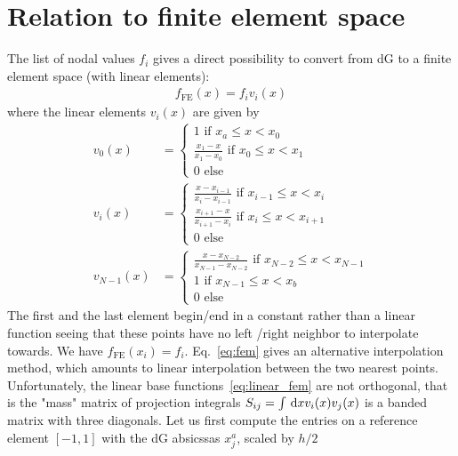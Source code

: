 \section{Relation to finite element space}
The list of nodal values $f_i$ gives a direct possibility to convert from dG to a finite element space (with linear elements):
\begin{align} \label{eq:fem}
    f_{\text{FE}}(x) = f_{i} v_{i}(x)
\end{align}
where the linear elements $v_i(x)$ are given by
\begin{align}\label{eq:linear_fem}
    v_0(x) &= \begin{cases}
        1 \text{ if } x_{a}\leq x<x_{0} \\
        \frac{x_{1} - x}{x_{1} - x_{0}} \text{ if } x_{0}\leq x<x_{1} \\
         0 \text{ else}
    \end{cases}
    \\
    v_{i}(x) &= \begin{cases}
        \frac{x - x_{i-1} }{x_{i} - x_{i-1}} \text{ if } x_{i-1}\leq x<x_{i} \\
        \frac{x_{i+1} - x}{x_{i+1} - x_{i}} \text{ if } x_{i}\leq x<x_{i+1} \\
         0 \text{ else}
    \end{cases}
    \\
    v_{N-1}(x) &= \begin{cases}
        \frac{x - x_{N-2} }{x_{N-1} - x_{N-2}} \text{ if } x_{N-2}\leq x<x_{N-1} \\
        1 \text{ if } x_{N-1}\leq x<x_{b} \\
         0 \text{ else}
    \end{cases}
\end{align}
The first and the last element begin/end in a constant rather than a linear function
seeing that these points have no left /right neighbor to interpolate towards.
We have $f_{\text{FE}}(x_{i}) = f_{i}$. Eq.~\eqref{eq:fem} gives an alternative
interpolation method, which amounts to linear interpolation between the two nearest
points. Unfortunately, the linear base functions~\eqref{eq:linear_fem} are not
orthogonal, that is the "mass" matrix of projection integrals $S_{ij} = \int \,\mathrm{d}x v_i(x)v_j(x)$ is a banded matrix with three diagonals.
Let us first compute the entries on a reference element $[-1,1]$
with the dG absicssas $x_j^a$, scaled by $h/2$
